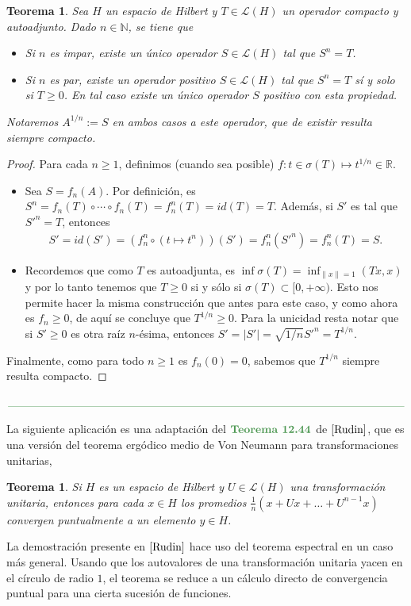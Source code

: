\documentclass[11pt]{report}
\theoremstyle{colored}
\newtheorem{theorem}{Teorema}[section]
\newtheorem*{theorem*}{Teorema}
\newcommand{\N}{\mathbb{N}}
\newcommand{\R}{\mathbb{R}}
\newcommand{\paint}[1]{\color{color}{#1}}
\newcommand{\tpaint}[1]{\paint{\textbf{#1}}}
\newcommand{\paintline}{\begin{center}
$\paint{
\rule{400pt}{0.5pt}
}$
\vspace{10pt}
\end{center}}
\begin{document}
\begin{theorem}  Sea $H$ un espacio de Hilbert y $T \in \mathscr{L}(H)$ un operador compacto y autoadjunto. Dado $n \in \N$, se tiene que 
\begin{itemize}
\item[(i)] Si $n$ es impar, existe un único operador $S \in \mathscr{L}(H)$ tal que $S^n = T$.
\item[(ii)] Si $n$ es par, existe un operador positivo $S \in \mathscr{L}(H)$ tal que $S^n = T$ sí y solo si $T \geq 0$. En tal caso existe un único operador $S$ positivo con esta propiedad.
\end{itemize}
Notaremos $A^{1/n} := S$ en ambos casos a este operador, que de existir resulta siempre compacto.
\end{theorem}
\begin{proof} Para cada $n \geq 1$, definimos (cuando sea posible) $f :t \in \sigma(T) \mapsto t^{1/n} \in \R$.
\begin{itemize}[listparindent = \parindent] 
\item[(i)] Sea $S = f_n(A)$. Por definición, es $S^n = f_n(T) \circ \cdots \circ f_n(T) = f_n^n(T) = id(T) = T$. Además, si $S'$ es tal que $S'^n = T$, entonces
\begin{align*}
S' = id(S') = (f_n^n \circ (t \mapsto t^n))(S') = f_n^n(S'^n) = f_n^n(T) = S.
\end{align*}
\item[(ii)] Recordemos que como $T$ es autoadjunta, es $\inf \sigma(T) = \inf_{\|x\| = 1} (Tx,x)$ y por lo tanto tenemos que $T \geq 0$ si y sólo si $\sigma(T) \subset [0,+\infty)$. 
Esto nos permite hacer la misma construcción que antes para este caso, y como ahora es $f_n \geq 0$, de aquí se concluye que $T^{1/n} \geq 0$. Para la unicidad resta notar que si $S' \geq 0$ es otra raíz $n$-ésima, entonces $S' = |S'| = \sqrt{1/n}{S'^n} = T^{1/n}$.
\end{itemize}

Finalmente, como para todo $n \geq 1$ es $f_n(0) = 0$, sabemos que $T^{1/n}$ siempre resulta compacto.
\end{proof}

\paintline

La siguiente aplicación es una adaptación del $\tpaint{Teorema 12.44}$ de $\cite{Rudin}$, que es una versión del teorema ergódico medio de Von Neumann para transformaciones unitarias,

\begin{tcolorbox}
\begin{theorem*} Si $H$ es un espacio de Hilbert y $U \in \mathscr{L}(H)$ una transformación unitaria, entonces para cada $x \in H$ los \textit{promedios} $\frac{1}{n}(x + Ux + \dots + U^{n-1}x)$ convergen puntualmente a un elemento $y \in H$.
\end{theorem*}
\end{tcolorbox}
La demostración presente en $\cite{Rudin}$ hace uso del teorema espectral en un caso más general. Usando que los autovalores de una transformación unitaria yacen en el círculo de radio $1$, el teorema se reduce a un cálculo directo de convergencia puntual para una cierta sucesión de funciones.
\end{document}
